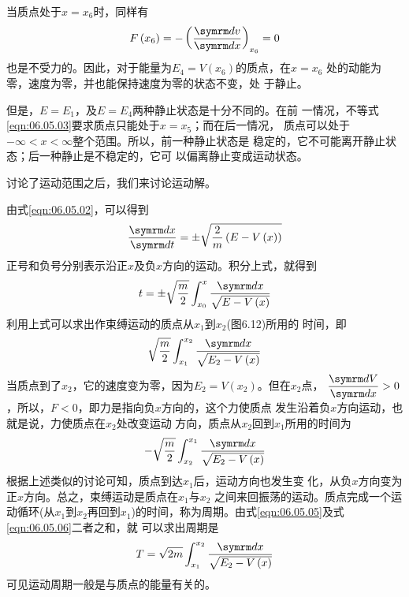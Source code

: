 当质点处于$ x = x_6 $时，同样有
\begin{equation*}
  F \left( x _ { 6 } \right) = - \left( \frac { \dif v } { \dif x } \right) _ { x _ 6 } = 0
\end{equation*}
也是不受力的。因此，对于能量为$ E _ { 4 } = V \left( x _ { 6 } \right) $的质点，在$ x = x _ { 6 } $
处的动能为零，速度为零，并也能保持速度为零的状态不变，处
于静止。

但是，$ E = E _ { 1 } $，及$ E = E _ 4 $两种静止状态是十分不同的。在前
一情况，不等式\eqref{eqn:06.05.03}要求质点只能处于$ x = x _ { 5 } $；而在后一情况，
质点可以处于$ - \infty < x < \infty $整个范围。所以，前一种静止状态是
稳定的，它不可能离开静止状态；后一种静止是不稳定的，它可
以偏离静止变成运动状态。

讨论了运动范围之后，我们来讨论运动解。

由式\eqref{eqn:06.05.02}，可以得到
\begin{equation*}
  \frac { \dif x } { \dif t } = \pm \sqrt { \frac { 2 } { m } \left( E - V \left( x \right) \right) }
\end{equation*}
正号和负号分别表示沿正$ x $及负$ x $方向的运动。积分上式，就得到
\begin{equation}\label{eqn:06.05.04}
  t = \pm \sqrt { \frac { m } { 2 } } \int _ { x _ { 0 } } ^ { x } \frac { \dif x } { \sqrt { E - V \left( x \right) } }
\end{equation}
利用上式可以求出作束缚运动的质点从$ x_1 $到$ x_2 $(图6.12)所用的
时间，即
\begin{equation}\label{eqn:06.05.05}
  \sqrt { \frac { m } { 2 } } \int _ { x _ { 1 } } ^ { x _ { 2 } } \frac { \dif x } { \sqrt { E _ { 2 } - V \left( x \right) } }
\end{equation}
当质点到了$ x_2 $，它的速度变为零，因为$ E _ { 2 } = V \left( x _ { 2 } \right) $。但在$ x_2 $点，
$ \dfrac { \dif V } { \dif x } > 0 $
，所以，$ F < 0 $，即力是指向负$ x $方向的，这个力使质点
发生沿着负$ x $方向运动，也就是说，力使质点在$ x_2 $处改变运动
方向，质点从$ x_2 $回到$ x_1 $所用的时间为
\begin{equation}\label{eqn:06.05.06}
  - \sqrt { \frac { m } { 2 } } \int _ { x _ { 2 } } ^ { x _ { 1 } } \frac { \dif x } { \sqrt { E _ { 2 } - V \left( x \right) } }
\end{equation}
根据上述类似的讨论可知，质点到达$ x_1 $后，运动方向也发生变
化，从负$ x $方向变为正$ x $方向。总之，束缚运动是质点在$ x_1 $与$ x_2 $
之间来回振荡的运动。质点完成一个运动循环(从$ x_1 $到$ x_2 $再回到$
  x _ { 1 } $)的时间，称为周期。由式\eqref{eqn:06.05.05}及式\eqref{eqn:06.05.06}二者之和，就
可以求出周期是
\begin{equation}\label{eqn:06.05.07}
  T = \sqrt { 2 m } \int _ { x _ { 1 } } ^ { x _ { 2 } } \frac { \dif x } { \sqrt { { E _ { 2 } - V \left( x \right) } } }
\end{equation}
可见运动周期一般是与质点的能量有关的。

